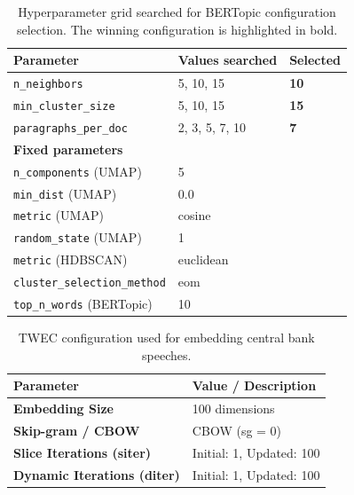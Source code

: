 \begin{appendices}
\begin{table}[h!]
    \centering
    \caption{Hyperparameter grid searched for BERTopic configuration selection.
             The winning configuration is highlighted in bold.}
    \label{tab:grid_params}
    \begin{tabular}{l l l}
        \hline
        \textbf{Parameter} & \textbf{Values searched} & \textbf{Selected} \\
        \hline
        \texttt{n\_neighbors}        & 5, 10, 15 & \textbf{10} \\
        \texttt{min\_cluster\_size}  & 5, 10, 15 & \textbf{15} \\
        \texttt{paragraphs\_per\_doc}& 2, 3, 5, 7, 10          & \textbf{7} \\
        \hline
        \multicolumn{3}{l}{\textbf{Fixed parameters}} \\
        \hline
        \texttt{n\_components} (UMAP)       & \multicolumn{2}{l}{5} \\
        \texttt{min\_dist} (UMAP)           & \multicolumn{2}{l}{0.0} \\
        \texttt{metric} (UMAP)              & \multicolumn{2}{l}{cosine} \\
        \texttt{random\_state} (UMAP)       & \multicolumn{2}{l}{1} \\
        \texttt{metric} (HDBSCAN)           & \multicolumn{2}{l}{euclidean} \\
        \texttt{cluster\_selection\_method} & \multicolumn{2}{l}{eom} \\
        \texttt{top\_n\_words} (BERTopic)   & \multicolumn{2}{l}{10} \\
        \hline
    \end{tabular}
\end{table}

\begin{table}[h!]
    \centering
    \caption{TWEC configuration used for embedding central bank speeches.}
    \label{tab:twec_params}
    \begin{tabular}{l l}
        \hline
        \textbf{Parameter} & \textbf{Value / Description} \\
        \hline
        \textbf{Embedding Size} & 100 dimensions \\
        \textbf{Skip-gram / CBOW} & CBOW (sg = 0) \\
        \textbf{Slice Iterations (siter)} & Initial: 1, Updated: 100 \\
        \textbf{Dynamic Iterations (diter)} & Initial: 1, Updated: 100 \\
        \hline
    \end{tabular}
\end{table}


\end{appendices}
